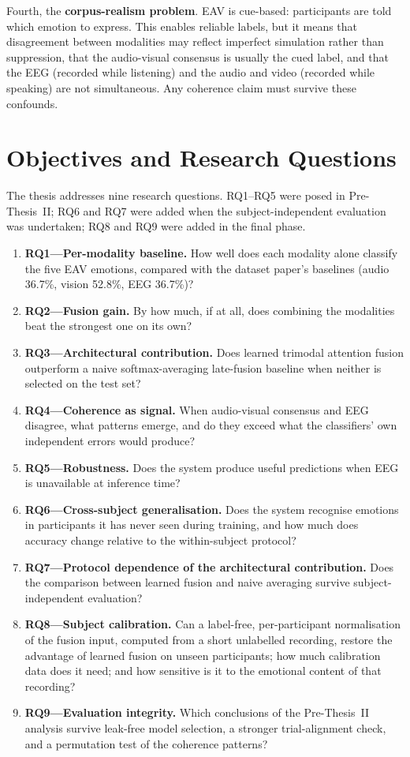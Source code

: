 Fourth, the \textbf{corpus-realism problem}. EAV is cue-based: participants are told which emotion to express. This enables reliable labels, but it means that disagreement between modalities may reflect imperfect simulation rather than suppression, that the audio-visual consensus is usually the cued label, and that the EEG (recorded while listening) and the audio and video (recorded while speaking) are not simultaneous. Any coherence claim must survive these confounds.

\section{Objectives and Research Questions}
The thesis addresses nine research questions. RQ1--RQ5 were posed in Pre-Thesis~II; RQ6 and RQ7 were added when the subject-independent evaluation was undertaken; RQ8 and RQ9 were added in the final phase.

\begin{enumerate}
    \item \textbf{RQ1---Per-modality baseline.} How well does each modality alone classify the five EAV emotions, compared with the dataset paper's baselines (audio 36.7\%, vision 52.8\%, EEG 36.7\%)?
    \item \textbf{RQ2---Fusion gain.} By how much, if at all, does combining the modalities beat the strongest one on its own?
    \item \textbf{RQ3---Architectural contribution.} Does learned trimodal attention fusion outperform a naive softmax-averaging late-fusion baseline when neither is selected on the test set?
    \item \textbf{RQ4---Coherence as signal.} When audio-visual consensus and EEG disagree, what patterns emerge, and do they exceed what the classifiers' own independent errors would produce?
    \item \textbf{RQ5---Robustness.} Does the system produce useful predictions when EEG is unavailable at inference time?
    \item \textbf{RQ6---Cross-subject generalisation.} Does the system recognise emotions in participants it has never seen during training, and how much does accuracy change relative to the within-subject protocol?
    \item \textbf{RQ7---Protocol dependence of the architectural contribution.} Does the comparison between learned fusion and naive averaging survive subject-independent evaluation?
    \item \textbf{RQ8---Subject calibration.} Can a label-free, per-participant normalisation of the fusion input, computed from a short unlabelled recording, restore the advantage of learned fusion on unseen participants; how much calibration data does it need; and how sensitive is it to the emotional content of that recording?
    \item \textbf{RQ9---Evaluation integrity.} Which conclusions of the Pre-Thesis~II analysis survive leak-free model selection, a stronger trial-alignment check, and a permutation test of the coherence patterns?
\end{enumerate}

